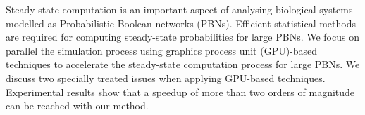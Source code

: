 Steady-state computation is an important aspect of analysing biological systems modelled as Probabilistic Boolean networks (PBNs). Efficient statistical methods are required for computing steady-state probabilities for large PBNs. We focus on parallel the simulation process using graphics process unit (GPU)-based techniques to accelerate the steady-state computation process for large PBNs. We discuss two specially treated issues when applying GPU-based techniques. Experimental results show that a speedup of more than two orders of magnitude can be reached with our method.